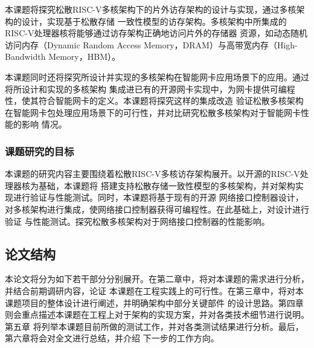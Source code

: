 本课题将探究松散RISC-V多核架构下的片外访存架构的设计与实现，通过多核架构的设计，实现基于松散存储
一致性模型的访存架构。多核架构中所集成的RISC-V处理器核将能够通过访存架构正确地访问片外的存储器
资源，如动态随机访问内存（Dynamic Random Access Memory，DRAM）与高带宽内存（High-Bandwidth
Memory，HBM）。

本课题同时还将探究所设计并实现的多核架构在智能网卡应用场景下的应用。通过将所设计和实现的多核架构
集成进已有的开源网卡实现中，为网卡提供可编程性，使其符合智能网卡的定义。本课题将探究这样的集成改造
验证松散多核架构在智能网卡包处理应用场景下的可行性，并对比研究松散多核架构对于智能网卡性能的影响
情况。

\subsubsection{课题研究的目标}

本课题的研究内容主要围绕着松散RISC-V多核访存架构展开。以开源的RISC-V处理器核为基础，本课题将
搭建支持松散存储一致性模型的多核架构，并对架构实现进行验证与性能测试。同时，本课题将基于现有的开源
网络接口控制器设计，对多核架构进行集成，使网络接口控制器获得可编程性。在此基础上，对设计进行验证
与性能测试。探究松散多核架构对于网络接口控制器的性能影响。

\subsection{论文结构}

本论文将分为如下若干部分分别展开。在第二章中，将对本课题的需求进行分析，并结合前期调研内容，论证
本课题在工程实践上的可行性。在第三章中，将对本课题项目的整体设计进行阐述，并明确架构中部分关键部件
的设计思路。第四章则会重点描述本课题在工程上对于架构的实现方案，并对各类技术细节进行说明。第五章
将列举本课题目前所做的测试工作，并对各类测试结果进行分析。最后，第六章将会对全文进行总结，并介绍
下一步的工作方向。

